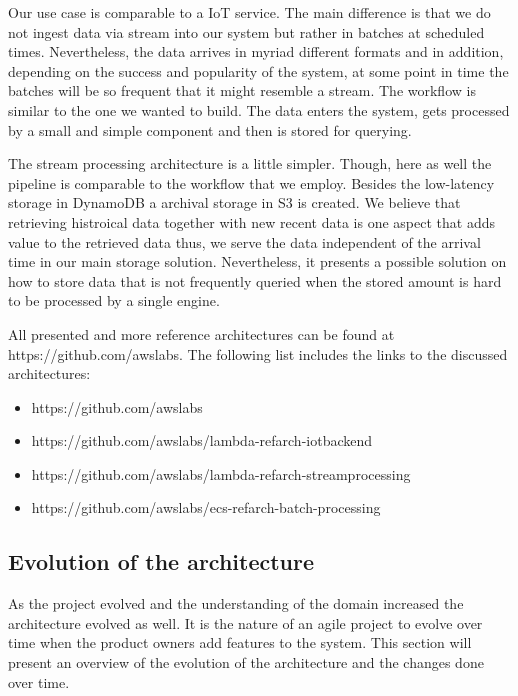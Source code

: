 Our use case is comparable to a IoT service. The main difference is that we do not ingest data via stream into our system but rather in batches at scheduled times. Nevertheless, the data arrives in myriad different formats and in addition, depending on the success and popularity of the system, at some point in time the batches will be so frequent that it might resemble a stream. The workflow is similar to the one we wanted to build. The data enters the system, gets processed by a small and simple component and then is stored for querying.

The stream processing architecture is a little simpler. Though, here as well the pipeline is comparable to the workflow that we employ. Besides the low-latency storage in DynamoDB a archival storage in S3 is created. We believe that retrieving histroical data together with new recent data is one aspect that adds value to the retrieved data thus, we serve the data independent of the arrival time in our main storage solution. Nevertheless, it presents a possible solution on how to store data that is not frequently queried when the stored amount is hard to be processed by a single engine.

All presented and more reference architectures can be found at https://github.com/awslabs. The following list includes the links to the discussed architectures:

\begin{itemize}
\tightlist
\item
  https://github.com/awslabs
\item
  https://github.com/awslabs/lambda-refarch-iotbackend
\item
  https://github.com/awslabs/lambda-refarch-streamprocessing
\item
  https://github.com/awslabs/ecs-refarch-batch-processing
\end{itemize}

\subsection{Evolution of the architecture}\label{evolution-of-the-architecture}

As the project evolved and the understanding of the domain increased the
architecture evolved as well. It is the nature of an agile project to
evolve over time when the product owners add features to the system.
This section will present an overview of the evolution of the
architecture and the changes done over time.

